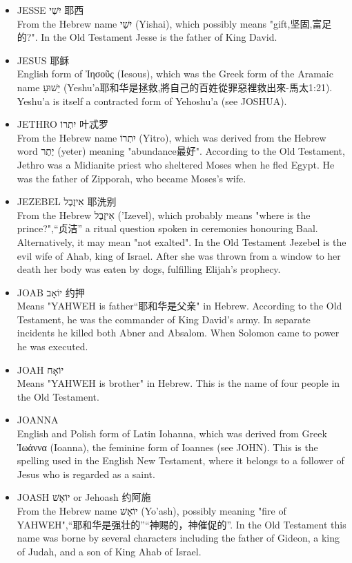 \begin{itemize}
\item JESSE יִשַׁי 耶西\\
From the Hebrew name יִשַׁי (Yishai), which possibly means "gift,坚固,富足的?". In the Old Testament Jesse is the father of King David. 
\item JESUS 耶稣  \\
English form of Ἰησοῦς (Iesous), which was the Greek form of the Aramaic name יֵשׁוּעַ (Yeshu'a耶和华是拯救,將自己的百姓從罪惡裡救出來-馬太1:21). Yeshu'a is itself a contracted form of Yehoshu'a (see JOSHUA). 
\item JETHRO יִתְרוֹ 叶忒罗\\
From the Hebrew name יִתְרוֹ (Yitro), which was derived from the Hebrew word יֶתֶר (yeter) meaning "abundance最好". According to the Old Testament, Jethro was a Midianite priest who sheltered Moses when he fled Egypt. He was the father of Zipporah, who became Moses's wife. 
\item JEZEBEL אִיזֶבֶל 耶洗别\\
From the Hebrew אִיזֶבֶל ('Izevel), which probably means "where is the prince?",“贞洁” a ritual question spoken in ceremonies honouring Baal. Alternatively, it may mean "not exalted". In the Old Testament Jezebel is the evil wife of Ahab, king of Israel. After she was thrown from a window to her death her body was eaten by dogs, fulfilling Elijah's prophecy.
\item JOAB יוֹאָב 约押\\
Means "YAHWEH is father“耶和华是父亲" in Hebrew. According to the Old Testament, he was the commander of King David's army. In separate incidents he killed both Abner and Absalom. When Solomon came to power he was executed.
\item JOAH יוֹאָח \\
Means "YAHWEH is brother" in Hebrew. This is the name of four people in the Old Testament.
\item JOANNA \\
English and Polish form of Latin Iohanna, which was derived from Greek Ἰωάννα (Ioanna), the feminine form of Ioannes (see JOHN). This is the spelling used in the English New Testament, where it belongs to a follower of Jesus who is regarded as a saint. 
\item JOASH יוֹאָשׁ or Jehoash  约阿施\\
From the Hebrew name יוֹאָשׁ (Yo'ash), possibly meaning "fire of YAHWEH",“耶和华是强壮的”“神赐的，神催促的”. In the Old Testament this name was borne by several characters including the father of Gideon, a king of Judah, and a son of King Ahab of Israel.

\end{itemize}
